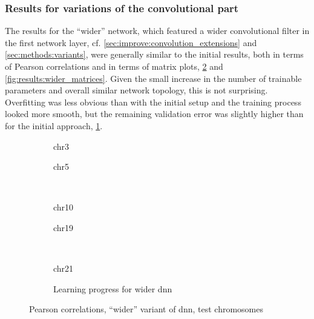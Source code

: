 \subsubsection{Results for variations of the convolutional part} \label{sec:results:wider-longer-etc}
The results for the ``wider'' network, which featured a wider convolutional filter in the first network layer, 
cf. \cref{sec:improve:convolution_extensions} and \ref{sec:methods:variants}, 
were generally similar to the initial results, both in terms of Pearson correlations and in terms of matrix plots, 
\cref{fig:results:widerDNN_pearson} and \ref{fig:results:wider_matrices}.
Given the small increase in the number of trainable parameters and overall similar network topology, this is not surprising.
Overfitting was less obvious than with the initial setup and the training process looked more smooth, 
but the remaining validation error was slightly higher than for the initial approach, \cref{fig:results:widerDNN_lossEpochs}.
\begin{figure}[p] %
    \begin{subfigure}{0.45\textwidth}
        \scriptsize
        \caption{chr3}
    \end{subfigure} \hfill
    \begin{subfigure}{0.45\textwidth}
        \scriptsize
        \caption{chr5}
    \end{subfigure}\\[5mm]
    \begin{subfigure}{0.45\textwidth}
        \scriptsize
        \caption{chr10}
    \end{subfigure}\hfill
    \begin{subfigure}{0.45\textwidth}
        \scriptsize
        \caption{chr19}
    \end{subfigure}\\[3mm]
    \centering
    \begin{subfigure}{0.45\textwidth}
        \scriptsize
        \caption{chr21}
    \end{subfigure}\hfill
    \begin{subfigure}{0.45\textwidth}
        \caption{Learning progress for wider \acrshort{dnn}} \label{fig:results:widerDNN_lossEpochs}
    \end{subfigure}
    \caption{Pearson correlations, ``wider'' variant of \acrshort{dnn},  test chromosomes}
    \label{fig:results:widerDNN_pearson}
\end{figure}
